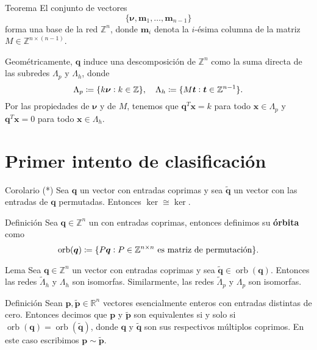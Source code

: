 \documentclass[aspectratio=169,professionalfonts]{beamer}
\newcommand{\Z}{\mathbb{Z}}
\newcommand{\R}{\mathbb{R}}
\renewcommand{\ker}[1]{\mathop{\mathrm{ker}{\left\lbrace #1 \right\rbrace}}}
\renewcommand{\vec}[1]{\boldsymbol{#1}}
\DeclareMathOperator{\orb}{orb}
\newcommand{\braces}[1]{\lbrace #1 \rbrace}
\newcommand{\tvec}[1]{\vec{\tilde{#1}}}
\begin{document}
\begin{frame}
	\begin{block}{Teorema}
		El conjunto de vectores
		\begin{equation*}
			\braces{\vec{\nu}, \vec{m}_1, \ldots, \vec{m}_{n-1}}
		\end{equation*}
		forma una base de la red $\Z^n$, donde $\vec{m}_i$ denota la $i$-ésima columna de
		la matriz $M \in \Z^{n \times (n-1)}$.
	\end{block}
	Geométricamente, $\vec{q}$ induce una descomposición de $\Z^n$
	como la suma directa de las subredes $\Lambda_p$ y $\Lambda_h$, donde
	\begin{equation*}
		\Lambda_p \coloneq \braces{k\vec{\nu} \vcentcolon k \in \Z}, \quad
		\Lambda_h \coloneq \braces{M\vec{t} \vcentcolon \vec{t} \in \Z^{n-1}}.
	\end{equation*}
	Por las propiedades de $\vec{\nu}$ y de $M$, tenemos que $\vec{q}^T\vec{x} =
	k$ para todo $\vec{x} \in \Lambda_p$ y $\vec{q}^T\vec{x} = 0$ para todo
	$\vec{x} \in \Lambda_h$.
\end{frame}

\section*{Primer intento de clasificación}
\begin{frame}
	\begin{block}{Corolario (*)}
		Sea $\vec{q}$ un vector con entradas coprimas y sea $\tvec{q}$ un vector con
		las entradas de $\vec{q}$ permutadas. Entonces $\ker{M^T} \cong
		\ker{\tilde{M}^T}$.
	\end{block}
	\begin{block}{Definición}
		Sea $\vec{q} \in \Z^n$ un con entradas coprimas, entonces definimos su
		\textbf{órbita} como
		\begin{equation*}
			\orb(\vec{q}) \coloneq \braces{P\vec{q} \vcentcolon P \in \Z^{n\times n} ~\text{es matriz de permutación}}.
		\end{equation*}
	\end{block}
\end{frame}

\begin{frame}
	\begin{block}{Lema}
		Sea $\vec{q} \in \Z^n$ un vector con entradas coprimas y sea $\tvec{q}
		\in \orb(\vec{q})$. Entonces las redes $\tilde{\Lambda}_h$ y $\Lambda_h$
		son isomorfas. Similarmente, las redes $\tilde{\Lambda}_p$ y $\Lambda_p$
		son isomorfas.
	\end{block}
	\begin{block}{Definición}
		Sean $\vec{p}, \tvec{p} \in \R^n$ vectores esencialmente enteros con
		entradas distintas de cero. Entonces decimos que $\vec{p}$ y $\tvec{p}$
		son equivalentes si y solo si $\orb(\vec{q}) = \orb(\tvec{q})$, donde
		$\vec{q}$ y $\tvec{q}$ son sus respectivos múltiplos coprimos. En este
		caso escribimos $\vec{p} \sim \tvec{p}$.
	\end{block}
\end{frame}
\end{document}
